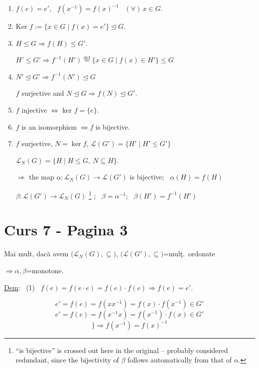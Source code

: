 \begin{enumerate}
\item[(1)] $f(e)=e'$, \ $f(x^{-1})=f(x)^{-1}$ \ $(\forall)\,x\in G$.
\item[(2).] Ker $f := \{x\in G \mid f(x)=e'\} \trianglelefteq G$.
\item[(3)] $H\leq G \Rightarrow f(H)\leq G'$.

\noindent $H'\leq G' \Rightarrow f^{-1}(H') \overset{\text{def}}{=} \{x\in G \mid f(x)\in H'\} \leq G$
\item[(4).] $N'\trianglelefteq G' \Rightarrow f^{-1}(N')\trianglelefteq G$

\noindent $f$ surjective and $N\trianglelefteq G \Rightarrow f(N)\trianglelefteq G'$.
\item[(5).] $f$ injective $\Leftrightarrow$ ker $f=\{e\}$.
\item[(6).] $f$ is an isomorphism $\Leftrightarrow f$ is bijective.
\item[(7)] $f$ surjective, $N=\ker f$, $\mathcal{L}(G')=\{H' \mid H'\leq G'\}$

\noindent $\mathcal{L}_N(G) = \{H \mid H\leq G,\ N\subseteq H\}$.

\noindent $\Rightarrow$ the map $\alpha:\mathcal{L}_N(G) \to \mathcal{L}(G')$ is bijective; \ $\alpha(H)=f(H)$

\noindent $\beta: \mathcal{L}(G') \to \mathcal{L}_N(G)$ \footnote{``is bijective'' is crossed out here in the original -- probably considered redundant, since the bijectivity of $\beta$ follows automatically from that of $\alpha$.} ; \ $\beta=\alpha^{-1}$; \ $\beta(H')=f^{-1}(H')$
\end{enumerate}




\section*{Curs 7 - Pagina 3}

\noindent Mai mult, dacă avem $\big(\mathcal{L}_N(G),\subseteq\big)$, $\big(\mathcal{L}(G'),\subseteq\big)$=mulţ.\ ordonate

\noindent $\Rightarrow \alpha,\beta$=monotone.

\bigskip
\noindent\underline{Dem}: \ (1) \ $f(e) = f(e\cdot e) = f(e)\cdot f(e) \Rightarrow f(e)=e'$.

\[
e' = f(e) = f(xx^{-1}) = f(x)\cdot f(x^{-1}) \in G'
\]
\[
e' = f(e) = f(x^{-1}x) = f(x^{-1})\cdot f(x) \in G'
\]
\[
\Big\} \Rightarrow f(x^{-1}) = f(x)^{-1}
\]


